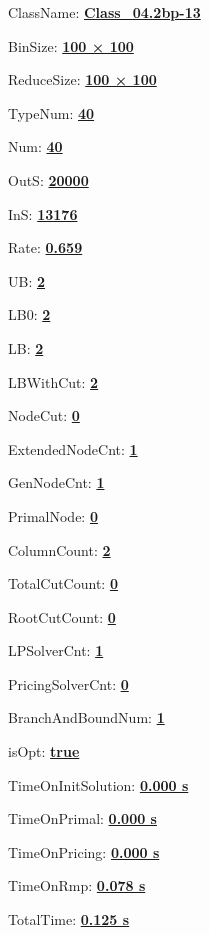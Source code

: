 \documentclass[11pt]{article}
\begin{document}
\pagestyle{empty}


ClassName: \underline{\textbf{Class_04.2bp-13}}
\par
BinSize: \underline{\textbf{100 × 100}}
\par
ReduceSize: \underline{\textbf{100 × 100}}
\par
TypeNum: \underline{\textbf{40}}
\par
Num: \underline{\textbf{40}}
\par
OutS: \underline{\textbf{20000}}
\par
InS: \underline{\textbf{13176}}
\par
Rate: \underline{\textbf{0.659}}
\par
UB: \underline{\textbf{2}}
\par
LB0: \underline{\textbf{2}}
\par
LB: \underline{\textbf{2}}
\par
LBWithCut: \underline{\textbf{2}}
\par
NodeCut: \underline{\textbf{0}}
\par
ExtendedNodeCnt: \underline{\textbf{1}}
\par
GenNodeCnt: \underline{\textbf{1}}
\par
PrimalNode: \underline{\textbf{0}}
\par
ColumnCount: \underline{\textbf{2}}
\par
TotalCutCount: \underline{\textbf{0}}
\par
RootCutCount: \underline{\textbf{0}}
\par
LPSolverCnt: \underline{\textbf{1}}
\par
PricingSolverCnt: \underline{\textbf{0}}
\par
BranchAndBoundNum: \underline{\textbf{1}}
\par
isOpt: \underline{\textbf{true}}
\par
TimeOnInitSolution: \underline{\textbf{0.000 s}}
\par
TimeOnPrimal: \underline{\textbf{0.000 s}}
\par
TimeOnPricing: \underline{\textbf{0.000 s}}
\par
TimeOnRmp: \underline{\textbf{0.078 s}}
\par
TotalTime: \underline{\textbf{0.125 s}}
\par
\newpage
\end{document}
